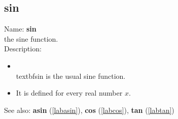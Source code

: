 \subsection{sin}
\label{labsin}
\noindent Name: \textbf{sin}\\
the sine function.\\
\noindent Description: \begin{itemize}

\item \\textbf{sin} is the usual sine function.\n
\item It is defined for every real number $x$.\n\end{itemize}
See also: \textbf{asin} (\ref{labasin}), \textbf{cos} (\ref{labcos}), \textbf{tan} (\ref{labtan})
